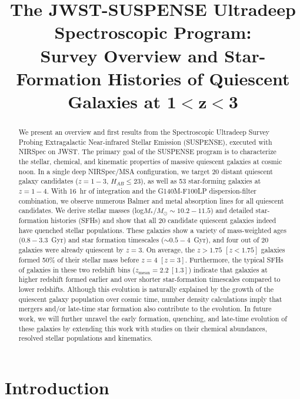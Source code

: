 \documentclass[twocolumn, astrosymb]{aastex631}
\begin{document}
\title{The JWST-SUSPENSE Ultradeep Spectroscopic Program: \\ Survey Overview and Star-Formation Histories of Quiescent Galaxies at $\boldsymbol{1<z<3}$}




\begin{abstract}
We present an overview and first results from the Spectroscopic Ultradeep Survey Probing Extragalactic Near-infrared Stellar Emission (SUSPENSE), executed with NIRSpec on JWST. The primary goal of the SUSPENSE program is to characterize the stellar, chemical, and kinematic properties of massive quiescent galaxies at cosmic noon. In a single deep NIRSpec/MSA configuration, we target 20 distant quiescent galaxy candidates ($z=1-3$, $H_{AB}\le23$), as well as 53 star-forming galaxies at $z=1-4$. With 16~hr of integration and the G140M-F100LP dispersion-filter combination, we observe numerous Balmer and metal absorption lines for all quiescent candidates. We derive stellar masses (log$M_*/M_{\odot}\sim10.2-11.5$) and detailed star-formation histories (SFHs) and show that all 20 candidate quiescent galaxies indeed have quenched stellar populations. These galaxies show a variety of mass-weighted ages ($0.8-3.3$~Gyr) and star formation timescales ($\sim0.5-4$~Gyr), and four out of 20 galaxies were already quiescent by $z=3$. On average, the $z>1.75$ $[z<1.75]$ galaxies formed 50\% of their stellar mass before $z=4$ $[z=3]$. Furthermore, the typical SFHs of galaxies in these two redshift bins ($z_{\text{mean}}=2.2~[1.3]$) indicate that galaxies at higher redshift formed earlier and over shorter star-formation timescales compared to lower redshifts. Although this evolution is naturally explained by the growth of the quiescent galaxy population over cosmic time, number density calculations imply that mergers and/or late-time star formation also contribute to the evolution. In future work, we will further unravel the early formation, quenching, and late-time evolution of these galaxies by extending this work with studies on their chemical abundances, resolved stellar populations and kinematics.
\end{abstract}

\keywords{}

\section{Introduction}\label{sec:intro}
\end{document}
